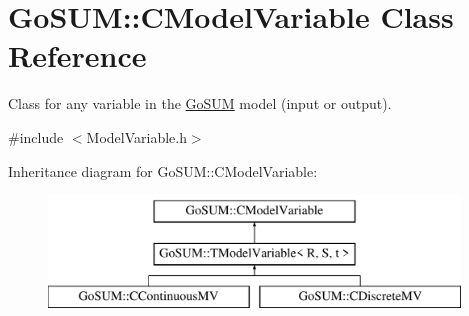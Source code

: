 \hypertarget{class_go_s_u_m_1_1_c_model_variable}{\section{Go\-S\-U\-M\-:\-:C\-Model\-Variable Class Reference}
\label{class_go_s_u_m_1_1_c_model_variable}
}


Class for any variable in the \hyperlink{struct_go_s_u_m}{Go\-S\-U\-M} model (input or output).  




{\ttfamily \#include $<$Model\-Variable.\-h$>$}

Inheritance diagram for Go\-S\-U\-M\-:\-:C\-Model\-Variable\-:\begin{figure}[H]
\begin{center}
\leavevmode
\includegraphics[height=3.000000cm]{class_go_s_u_m_1_1_c_model_variable}
\end{center}
\end{figure}

